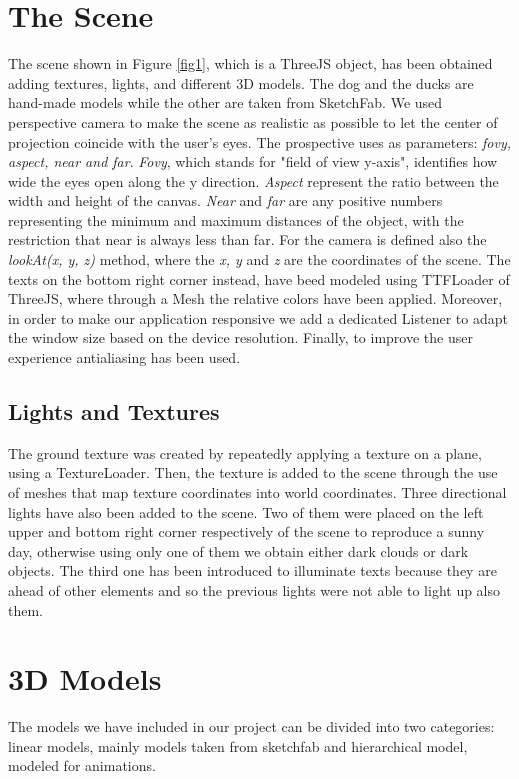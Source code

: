 \documentclass{article}
\begin{document}
\section{The Scene}
The scene shown in Figure \ref{fig1}, which is a ThreeJS object, 
has been obtained adding textures, lights, and different 3D models. 
The dog and the ducks are hand-made models while the other are 
taken from SketchFab. We used perspective camera to make the scene 
as realistic as possible to let the center of projection coincide 
with the user’s eyes.
The prospective uses as parameters: \textit{fovy, aspect, near and 
far}. \textit{Fovy}, which stands for "field of view y-axis",
identifies how wide the eyes open along the y direction.
\textit{Aspect} represent the ratio between the width and height
of the canvas.
\textit{Near} and \textit{far} are any positive numbers 
representing the minimum and maximum distances of the object, 
with the restriction that near is always less than far.
For the camera is defined also the  
\textit{lookAt(x, y, z)} method, where the \textit{x, y} and \textit{z} 
are the coordinates of the scene.
The texts on the bottom right corner instead, have beed modeled using
TTFLoader of ThreeJS, where through a Mesh the relative 
colors have been applied.
Moreover, in order to make our application responsive we add a 
dedicated Listener to adapt the window size based on the device
resolution. Finally, to improve the user experience antialiasing 
has been used.
\subsection{Lights and Textures}
The ground texture was created by repeatedly applying a texture on 
a plane, using a TextureLoader. Then, the texture is added to the
scene through the use of meshes that map texture coordinates into
world coordinates.
Three directional lights have also been added to the scene. 
Two of them were placed on the left upper and bottom right corner 
respectively of the scene to reproduce a sunny day, otherwise using
only one of them we obtain either dark clouds or dark objects. 
The third one has been introduced to illuminate texts because they 
are ahead of other elements and so the previous lights were
not able to light up also them.
\section{3D Models}
The models we have included in our project can be divided into 
two categories: linear models, mainly models taken from sketchfab 
and hierarchical model, modeled for animations. 
\end{document}
